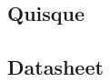 \postextual



%

\begin{apendicesenv}
\partapendices

\chapter{Quisque}

\lipsum[50]



\end{apendicesenv}

\begin{anexosenv}
\partanexos

\chapter{Datasheet}\label{anexo1}
%


\end{anexosenv}


